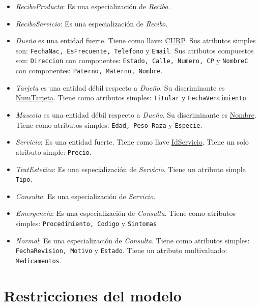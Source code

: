 \documentclass{exam}
\begin{document}
\begin{itemize}
	\item \textit{ReciboProducto}: Es una especialización de \textit{Recibo}.
	\item \textit{ReciboServicio}: Es una especialización de \textit{Recibo}.
	\item \textit{Dueño} es una entidad fuerte. Tiene como llave: \underline{CURP}. Sus atributos simples son: \texttt{FechaNac, EsFrecuente, Telefono} y \texttt{Email}. Sus atributos compuestos son: \texttt{Direccion} con componentes: \texttt{Estado, Calle, Numero, CP} y \texttt{NombreC} con componentes: \texttt{Paterno, Materno, Nombre}.
	\item \textit{Tarjeta} es una entidad débil respecto a \textit{Dueño}. Su discriminante es \underline{NumTarjeta}. Tiene como atributos simples: \texttt{Titular} y \texttt{FechaVencimiento}.
	\item \textit{Mascota} es una entidad débil respecto a \textit{Dueño}. Su discriminante es \underline{Nombre}. Tiene como atributos simples: \texttt{Edad, Peso Raza} y \texttt{Especie}.
	\item \textit{Servicio}: Es una entidad fuerte. Tiene como llave \underline{IdServicio}. Tiene un solo atributo simple: \texttt{Precio}.
	\item \textit{TratEstetico}: Es una especialización de \textit{Servicio}. Tiene un atributo simple \texttt{Tipo}.
	\item \textit{Consulta}: Es una especialización de \textit{Servicio}.
	\item \textit{Emergencia}: Es una especialización de \textit{Consulta}. Tiene como atributos simples: \texttt{Procedimiento, Codigo} y \texttt{Sintomas}
	\item \textit{Normal}: Es una especialización de \textit{Consulta}. Tiene como atributos simples: \texttt{FechaRevision, Motivo} y \texttt{Estado}. Tiene un atributo multivaluado: \texttt{Medicamentos}.
\end{itemize}

\section*{Restricciones del modelo}
    
\end{document}

